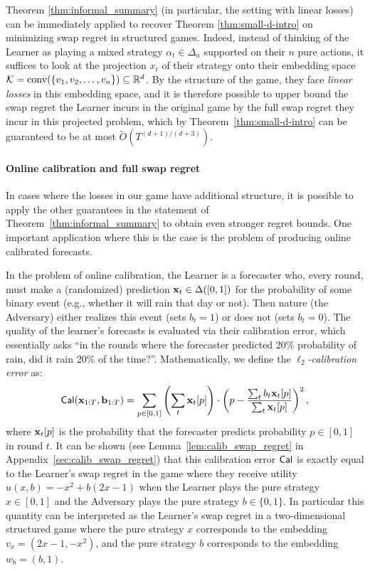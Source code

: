 \documentclass[final,12pt]{alt2025}
\begin{document}
Theorem \ref{thm:informal_summary} (in particular, the setting with linear losses) can be immediately applied to recover Theorem \ref{thm:small-d-intro} on minimizing swap regret in structured games. Indeed, instead of thinking of the Learner as playing a mixed strategy $\alpha_t \in \Delta_n$ supported on their $n$ pure actions, it suffices to look at the projection $x_t$ of their strategy onto their embedding space $\mathcal{K} = \mathrm{conv}(\{v_1, v_2, \dots, v_n\}) \subseteq \mathbb{R}^d$. By the structure of the game, they face \emph{linear losses} in this embedding space, and it is therefore possible to upper bound the swap regret the Learner incurs in the original game by the full swap regret they incur in this projected problem, which by Theorem~\ref{thm:small-d-intro} can be guaranteed to be at most $\tilde{O}(T^{(d+1)/(d+3)})$. 


\paragraph{Online calibration and full swap regret}

In cases where the losses in our game have additional structure, it is possible to apply the other guarantees in the statement of Theorem~\ref{thm:informal_summary} to obtain even stronger regret bounds. One important application where this is the case is the problem of producing online calibrated forecasts.

In the problem of online calibration, the Learner is a forecaster who, every round, must make a (randomized) prediction $\mathbf{x}_t \in \Delta([0, 1])$ for the probability of some binary event (e.g., whether it will rain that day or not). Then nature (the Adversary) either realizes this event (sets $b_t = 1$) or does not (sets $b_t = 0$). The quality of the learner's forecasts is evaluated via their calibration error, which essentially asks ``in the rounds where the forecaster predicted 20\% probability of rain, did it rain 20\% of the time?''. Mathematically, we define the \emph{$\ell_2$-calibration error} as:
\begin{equation*}
    \operatorname{\mathsf{Cal}}(\mathbf{x}_{1:T}, \mathbf{b}_{1:T}) = \sum_{p \in [0, 1]}\left(\sum_{t} \mathbf{x}_t[p] \right) \cdot \left(p - \frac{\sum_{t} b_t \mathbf{x}_t[p]}{\sum_t \mathbf{x}_t[p]}\right)^2,
\end{equation*}
where $\mathbf{x}_t[p]$ is the probability that the forecaster predicts probability $p \in [0,1]$ in round $t$. It can be shown (see Lemma~\ref{lem:calib_swap_regret} in Appendix~\ref{sec:calib_swap_regret}) that this calibration error $\operatorname{\mathsf{Cal}}$ is exactly equal to the Learner's swap regret in the game where they receive utility $u(x, b) = -x^2 + b(2x - 1)$ when the Learner plays the pure strategy $x \in [0, 1]$ and the Adversary plays the pure strategy $b \in \{0, 1\}$. In particular this quantity can be interpreted as the Learner's swap regret in a two-dimensional structured game where the pure strategy $x$ corresponds to the embedding $v_{x} = (2x-1, -x^2)$, and the pure strategy $b$ corresponds to the embedding $w_{b} = (b, 1)$.
\end{document}
